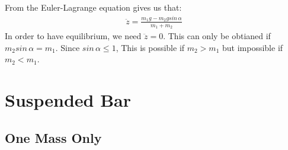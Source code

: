 \documentclass{article}
\begin{document}
\subsection{} %

From the Euler-Lagrange equation gives us that:
\begin{align*}
	\ddot{z} = \frac{ m_1g - m_2gsin\,\alpha}{m_1 + m_2}
\end{align*}
In order to have equilibrium, we need $\ddot{z} = 0$. This can only be obtianed if $m_2sin\,\alpha = m_1$. Since $sin\,\alpha \leq 1$, This is possible if $m_2 > m_1$ but impossible if $m_2 < m_1$.

\section{Suspended Bar}

\subsection{One Mass Only}

\subsubsection{} %



\subsubsection{} %



\subsubsection{} %



\subsubsection{} %



\subsubsection{} %



\subsubsection{} %
\end{document}
